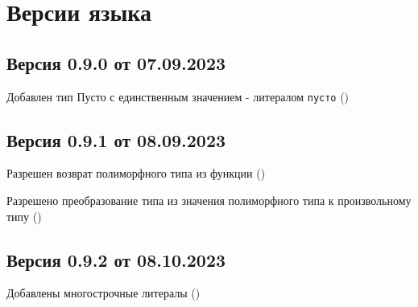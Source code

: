 \hypertarget{versions}{%
\section{Версии языка}\label{versions:chapter}}

\hypertarget{v090}{%
\subsection{Версия 0.9.0 от 07.09.2023}\label{versions:v090}}

\begin{d_itemize}
\item Добавлен тип Пусто с единственным значением - литералом \verb+пусто+  ()
\end{d_itemize}

\hypertarget{v091}{%
\subsection{Версия 0.9.1 от 08.09.2023}\label{versions:v091}}

\begin{d_itemize}
\item Разрешен возврат полиморфного типа из функции  ()
\item Разрешено преобразование типа из значения полиморфного типа к произвольному типу  ()
\end{d_itemize}

\hypertarget{v092}{%
\subsection{Версия 0.9.2 от 08.10.2023}\label{versions:v090}}

\begin{d_itemize}
\item Добавлены многострочные литералы ()
\end{d_itemize}

